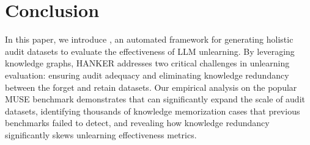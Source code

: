 \section{Conclusion}
\label{sec:conclusion}

In this paper, we introduce \sys, an automated framework for generating holistic audit datasets to evaluate the effectiveness of LLM unlearning. By leveraging knowledge graphs, HANKER addresses two critical challenges in unlearning evaluation: ensuring audit adequacy and eliminating knowledge redundancy between the forget and retain datasets. 
Our empirical analysis on the popular MUSE benchmark demonstrates that \sys can significantly expand the scale of audit datasets, identifying thousands of knowledge memorization cases that previous benchmarks failed to detect, and revealing how
knowledge redundancy significantly skews unlearning effectiveness metrics.
